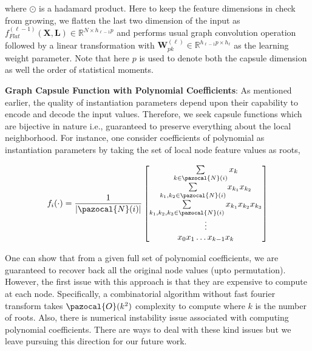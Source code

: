 \documentclass{article}
\newcommand{\Na}{\pazocal{N}}
\newcommand{\BigO}{\pazocal{O}}
\begin{document}
 where $\odot$ is a hadamard  product. Here to keep the feature dimensions in check from growing, we flatten the last two dimension of the input as  $f^{(\ell-1)}_{Flat}(\mathbf{X}, \mathbf{L}) \in \mathbb{R}^{N \times h_{\ell-1}p}$
 and performs usual graph convolution operation followed by a  linear transformation with $\mathbf{W}_{pk}^{(\ell)} \in \mathbb{R}^{h_{\ell-1} p\times h_{\ell}}$  as the learning weight parameter. Note that here $p$ is used to denote both the capsule dimension as well   the order of statistical moments.


\noindent \textbf{Graph Capsule Function with Polynomial Coefficients}: As mentioned earlier, the quality of instantiation parameters depend upon their capability to encode and decode the  input values. Therefore, we   seek capsule functions which are bijective in nature i.e., guaranteed to preserve everything about the local neighborhood. For instance, one consider coefficients of polynomial as instantiation parameters by taking the set of local node  feature values as roots, 

\vspace{-0.5em}
\begin{equation}\label{eq:capsule}
\begin{split}
f_i(\cdot) &  =  \frac{1}{|\Na(i)|} \begin{bmatrix}
\sum\limits_{k \in \Na(i)} x_k \\
\sum\limits_{k_1, k_2 \in \Na(i)} x_{k_1}x_{k_2}    \\
\sum\limits_{k_1, k_2,k_3 \in \Na(i)}x_{k_1} x_{k_2}x_{k_3} \\
\vdots \\
x_0 x_1 \dots x_{k-1} x_k  \\
\end{bmatrix}\\
\end{split}
\end{equation}
\vspace{-0.5em}

One can show that from a given full set of  polynomial coefficients, we are guaranteed to recover back all the original node values (upto permutation). However, the first issue with   this approach is that they are   expensive to compute at each node. Specifically,  a combinatorial algorithm without fast fourier transform takes $\BigO(k^2)$  complexity to compute where $k$ is the number of roots. Also, there is numerical instability issue associated with computing   polynomial coefficients. There are   ways to deal with    these kind issues but we leave pursuing this direction   for our future work. 
\end{document}
